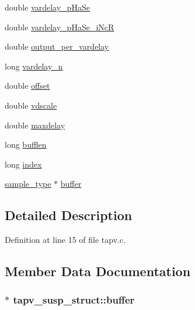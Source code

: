 \begin{DoxyCompactItemize}
\item 
double \hyperlink{structtapv__susp__struct_abe1f49d998e0dbc2a90a928cb9cb6a05}{vardelay\+\_\+p\+Ha\+Se}
\item 
double \hyperlink{structtapv__susp__struct_afc7c279a75184d2d5e1f0f3b518e84ce}{vardelay\+\_\+p\+Ha\+Se\+\_\+i\+NcR}
\item 
double \hyperlink{structtapv__susp__struct_afc611973e9b029aabf5bfdd40c0d7792}{output\+\_\+per\+\_\+vardelay}
\item 
long \hyperlink{structtapv__susp__struct_a3291327bfae272460373fad0dcc90f2e}{vardelay\+\_\+n}
\item 
double \hyperlink{structtapv__susp__struct_a8c91cf1875473eb25ea7f51ef29d9e21}{offset}
\item 
double \hyperlink{structtapv__susp__struct_a67a83b160d33ebe521f8065935962171}{vdscale}
\item 
double \hyperlink{structtapv__susp__struct_aab6d7e00bc522f8b1fb248f32e65866f}{maxdelay}
\item 
long \hyperlink{structtapv__susp__struct_a9d447f33cd9cf4ab925fc51f9b7894ec}{bufflen}
\item 
long \hyperlink{structtapv__susp__struct_ac3c02cf4fc16c75ba57d2d2582232ce1}{index}
\item 
\hyperlink{sound_8h_a3a9d1d4a1c153390d2401a6e9f71b32c}{sample\+\_\+type} $\ast$ \hyperlink{structtapv__susp__struct_a066d4e5d9eea707a6bb63dbbe485a027}{buffer}
\end{DoxyCompactItemize}


\subsection{Detailed Description}


Definition at line 15 of file tapv.\+c.



\subsection{Member Data Documentation}
\subsubsection[{\texorpdfstring{buffer}{buffer}}]{$\ast$ tapv\+\_\+susp\+\_\+struct\+::buffer}\hypertarget{structtapv__susp__struct_a066d4e5d9eea707a6bb63dbbe485a027}{}\label{structtapv__susp__struct_a066d4e5d9eea707a6bb63dbbe485a027}


